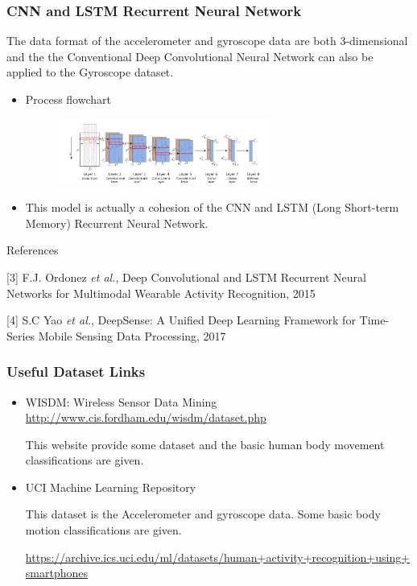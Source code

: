 \documentclass{beamer} %
\begin{document}
\begin{frame}
\frametitle{CNN and LSTM Recurrent Neural Network}

The data format of the accelerometer and gyroscope data are both 3-dimensional and the the Conventional Deep Convolutional Neural Network can also be applied to the Gyroscope dataset.

\begin{itemize}
\item Process flowchart

 \begin{figure}[htbp] 
	
	\begin{center}
		\includegraphics[width=7cm]{./image/g1} 	
	\end{center}
\end{figure}

\item This model is actually a cohesion of the CNN and LSTM (Long Short-term Memory) Recurrent Neural Network. 
\end{itemize}

\scriptsize References

\tiny [3] F.J. Ordonez \textit{et al.}, Deep Convolutional and LSTM Recurrent Neural Networks for Multimodal Wearable Activity Recognition, 2015

\tiny [4] S.C Yao \textit{et al.}, DeepSense: A Unified Deep Learning Framework for Time-Series Mobile Sensing Data Processing, 2017


\end{frame}

\begin{frame}
\frametitle{Useful Dataset Links}

\begin{itemize}
\item WISDM: Wireless Sensor Data Mining
\url{http://www.cis.fordham.edu/wisdm/dataset.php}

This website provide some dataset and the basic human body movement classifications are given. 

\item UCI Machine Learning Repository

This dataset is the Accelerometer and gyroscope data. Some basic body motion classifications are given. 

\url{https://archive.ics.uci.edu/ml/datasets/human+activity+recognition+using+smartphones}

\end{itemize}
\end{frame}
\end{document}
